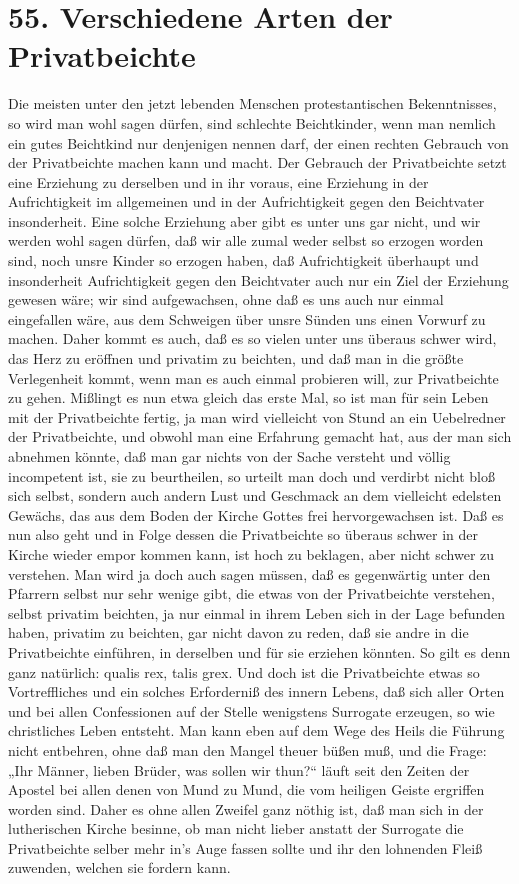 \section{55. Verschiedene Arten der Privatbeichte}

Die meisten unter den jetzt lebenden Menschen protestantischen Bekenntnisses, so wird man wohl sagen dürfen, sind schlechte Beichtkinder, wenn man nemlich ein gutes Beichtkind nur denjenigen nennen darf, der einen rechten Gebrauch von der Privatbeichte machen kann und macht. Der Gebrauch der Privatbeichte setzt eine Erziehung zu derselben und in ihr voraus, eine Erziehung in der Aufrichtigkeit im
allgemeinen und in der Aufrichtigkeit gegen den Beichtvater insonderheit. Eine solche Erziehung aber gibt es unter uns gar nicht, und wir werden wohl sagen dürfen, daß wir alle zumal weder selbst so erzogen worden sind, noch unsre Kinder so erzogen haben, daß Aufrichtigkeit überhaupt und insonderheit Aufrichtigkeit gegen den Beichtvater auch nur ein Ziel der Erziehung gewesen wäre; wir sind aufgewachsen, ohne daß es uns auch nur einmal eingefallen wäre, aus dem Schweigen über unsre Sünden uns einen Vorwurf zu machen. Daher kommt es auch, daß es so vielen unter uns überaus schwer wird, das Herz zu eröffnen und privatim zu beichten, und daß man in die größte Verlegenheit kommt, wenn man es auch einmal probieren will, zur Privatbeichte zu gehen. Mißlingt es nun etwa gleich das erste Mal, so ist man für sein Leben mit der Privatbeichte fertig, ja man wird vielleicht von Stund an ein Uebelredner der Privatbeichte, und obwohl man eine Erfahrung gemacht hat, aus der man sich abnehmen könnte, daß man gar nichts von der Sache versteht und völlig incompetent ist, sie zu beurtheilen, so urteilt man doch und verdirbt nicht bloß sich selbst, sondern auch andern Lust und Geschmack an dem vielleicht edelsten Gewächs, das aus dem Boden der Kirche Gottes frei hervorgewachsen ist. Daß es nun also geht und in Folge dessen die Privatbeichte so überaus schwer in der Kirche wieder empor kommen kann, ist hoch zu beklagen, aber nicht schwer zu verstehen. Man wird ja doch auch sagen müssen, daß es gegenwärtig unter den Pfarrern selbst nur sehr wenige gibt, die etwas von der Privatbeichte verstehen, selbst privatim
beichten, ja nur einmal in ihrem Leben sich in der Lage befunden haben, privatim zu beichten, gar nicht davon zu reden, daß sie andre in die Privatbeichte einführen, in derselben und für sie erziehen könnten. So gilt es denn ganz natürlich: qualis rex, talis grex. Und doch ist die Privatbeichte etwas so Vortreffliches und ein solches Erforderniß des innern Lebens, daß sich aller Orten und bei allen Confessionen auf der Stelle wenigstens Surrogate erzeugen, so wie christliches Leben entsteht. Man kann eben auf dem Wege des Heils die Führung nicht entbehren, ohne daß man den Mangel theuer büßen muß, und die Frage: „Ihr Männer, lieben Brüder, was sollen wir thun?“ läuft seit den Zeiten der Apostel bei allen denen von Mund zu Mund, die vom heiligen Geiste ergriffen worden sind. Daher es ohne allen Zweifel ganz nöthig ist, daß man sich in der lutherischen Kirche besinne, ob man nicht lieber anstatt der Surrogate die Privatbeichte selber mehr in’s Auge fassen sollte und ihr den lohnenden Fleiß zuwenden, welchen sie fordern kann.

